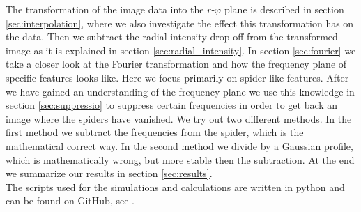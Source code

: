 The transformation of the image data into the $r$-$\varphi$ plane is described in section \ref{sec:interpolation}, where we also investigate the effect this transformation has on the data. Then we subtract the radial intensity drop off from the transformed image as it is explained in section \ref{sec:radial_intensity}. In section \ref{sec:fourier} we take a closer look at the Fourier transformation and how the frequency plane of specific features looks like. Here we focus primarily on spider like features. After we have gained an understanding of the frequency plane we use this knowledge in section \ref{sec:suppressio} to suppress certain frequencies in order to get back an image where the spiders have vanished. We try out two different methods. In the first method we subtract the frequencies from the spider, which is the mathematical correct way. In the second method we divide by a Gaussian profile, which is mathematically wrong, but more stable then the subtraction. At the end we summarize our results in section \ref{sec:results}.\\
The scripts used for the simulations and calculations are written in python and can be found 
on GitHub, see \cite{github}.
